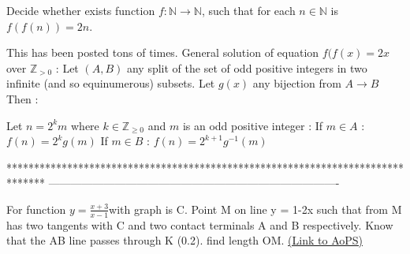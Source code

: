 \begin{solution}
	\begin{tcolorbox}Decide whether exists function $f:  \mathbb{N} \rightarrow  \mathbb{N}$, such that for each $n \in  \mathbb{N}$ is $f(f(n) )= 2n$.\end{tcolorbox}
This has been posted tons of times.
General solution of equation $f(f(x)=2x$ over $\mathbb Z_{>0}$  :
Let $(A,B)$ any split of the set of odd positive integers in two infinite (and so equinumerous) subsets.
Let $g(x)$ any bijection from $A\to B$
Then :

Let $n=2^km$ where $k\in\mathbb Z_{\ge 0}$ and $m$ is an odd positive integer :
If $m\in A$ : $f(n)=2^kg(m)$
If $m\in B$ : $f(n)=2^{k+1}g^{-1}(m)$
\end{solution}
*******************************************************************************
-------------------------------------------------------------------------------

\begin{problem}
	For function $y=\frac{x+3}{x-1}$with graph is C. Point M on  line y = 1-2x such that from M has two tangents with C and two contact terminals A and B respectively. Know that the AB line passes through K (0.2). find length OM.
	\flushright \href{https://artofproblemsolving.com/community/c6h1632713}{(Link to AoPS)}
\end{problem}



